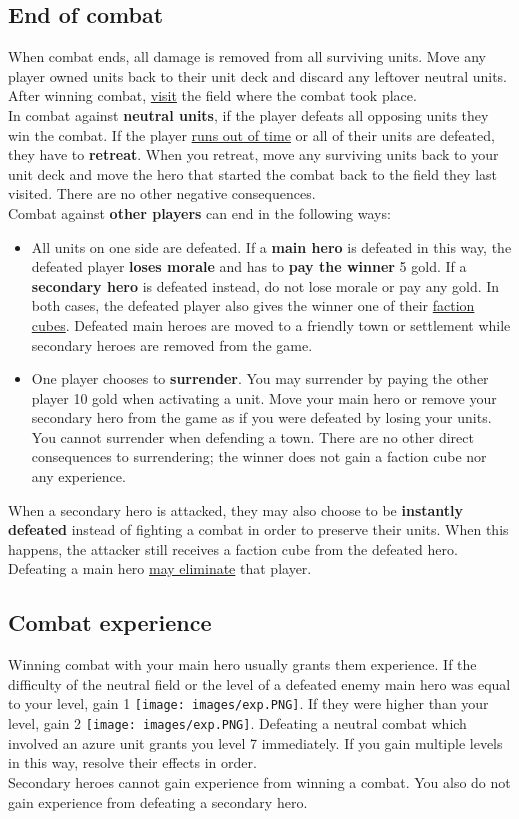\documentclass[12pt]{article}
\begin{document}
\subsection*{\hypertarget{Endcombat}{End of combat}}
When combat ends, all damage is removed from all surviving units. Move any player owned units back to their unit deck and discard any leftover neutral units. After winning combat, \hyperlink{Categories}{visit} the field where the combat took place.\\[6pt]
In combat against \textbf{neutral units}, if the player defeats all opposing units they win the combat. If the player \hyperlink{Timelimit}{runs out of time} or all of their units are defeated, they have to \textbf{retreat}. When you retreat, move any surviving units back to your unit deck and move the hero that started the combat back to the field they last visited. There are no other negative consequences.\\[6pt]
Combat against \textbf{other players} can end in the following ways:
\begin{itemize}
    \item All units on one side are defeated. If a \textbf{main hero} is defeated in this way, the defeated player \textbf{loses morale} and has to \textbf{pay the winner} 5 gold. If a \textbf{secondary hero} is defeated instead, do not lose morale or pay any gold. In both cases, the defeated player also gives the winner one of their \hyperlink{End}{faction cubes}. Defeated main heroes are moved to a friendly town or settlement while secondary heroes are removed from the game.
    \item One player chooses to \textbf{surrender}. You may surrender by paying the other player 10 gold when activating a unit. Move your main hero or remove your secondary hero from the game as if you were defeated by losing your units. You cannot surrender when defending a town. There are no other direct consequences to surrendering; the winner does not gain a faction cube nor any experience.
\end{itemize}
 When a secondary hero is attacked, they may also choose to be \textbf{instantly defeated} instead of fighting a combat in order to preserve their units. When this happens, the attacker still receives a faction cube from the defeated hero.\\[6pt] Defeating a main hero \hyperlink{End}{may eliminate} that player.

\subsection*{\hypertarget{Combatexperience}{Combat experience}}
Winning combat with your main hero usually grants them experience. If the difficulty of the neutral field or the level of a defeated enemy main hero was equal to your level, gain 1 \texttt{[image: images/exp.PNG]}. If they were higher than your level, gain 2 \texttt{[image: images/exp.PNG]}. Defeating a neutral combat which involved an azure unit grants you level 7 immediately. If you gain multiple levels in this way, resolve their effects in order.\\[6pt]
Secondary heroes cannot gain experience from winning a combat. You also do not gain experience from defeating a secondary hero.
\end{document}

